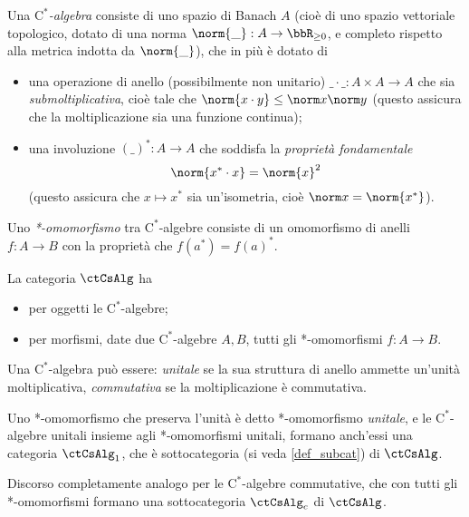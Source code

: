 \begin{example}
  Una \emph{$\mathrm{C}^*$-algebra} consiste di uno spazio di Banach $A$ (cioè di uno spazio vettoriale topologico, dotato di una norma $\norm{\_} : A \to \bbR_{\ge 0}$, e completo rispetto alla metrica indotta da $\norm{\_}$), che in più è dotato di
  \begin{itemize}
    \item una operazione di anello (possibilmente non unitario) $\_\cdot\_ : A \times A \to A$ che sia \emph{submoltiplicativa}, cioè tale che $\norm{x\cdot y} \le\norm x\norm y$ (questo assicura che la moltiplicazione sia una funzione continua);
  \item una involuzione $(\_)^* : A\to A$ che soddisfa la \emph{proprietà fondamentale}
    \[\norm{x^*\cdot x} = \norm{x}^2\]
    (questo assicura che $x\mapsto x^*$ sia un'isometria, cioè $\norm x = \norm{x^*}$).
\end{itemize}
Uno \emph{*-omomorfismo} tra $\mathrm{C}^*$-algebre consiste di un omomorfismo di anelli $f : A\to B$ con la proprietà che $f(a^*) = f(a)^*$.

La categoria $\ctCsAlg$ ha
\begin{itemize}
  \item per oggetti le $\mathrm{C}^*$-algebre;
\item per morfismi, date due $\mathrm{C}^*$-algebre $A,B$, tutti gli *-omomorfismi $f : A \to B$.
\end{itemize}
Una $\mathrm{C}^*$-algebra può essere: \emph{unitale} se la sua struttura di anello ammette un'unità moltiplicativa, \emph{commutativa} se la moltiplicazione è commutativa. 

Uno *-omomorfismo che preserva l'unità è detto *-omomorfismo \emph{unitale}, e le $\mathrm{C}^*$-algebre unitali insieme agli *-omomorfismi unitali, formano anch'essi una categoria $\ctCsAlg_1$, che è sottocategoria (si veda \ref{def_subcat}) di $\ctCsAlg$. 

Discorso completamente analogo per le $\mathrm{C}^*$-algebre commutative, che con tutti gli *-omomorfismi formano una sottocategoria $\ctCsAlg_c$ di $\ctCsAlg$.
\end{example}
